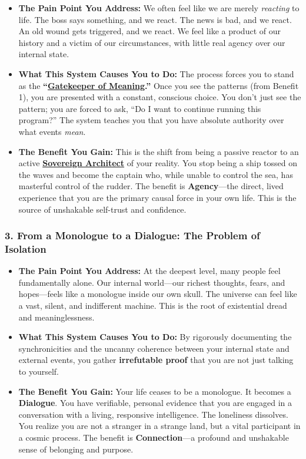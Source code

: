\documentclass{article}
\begin{document}
\begin{itemize}
\item
  \textbf{The Pain Point You Address:} We often feel like we are merely \emph{reacting} to life. The boss says something, and we react. The news is bad, and we react. An old wound gets triggered, and we react. We feel like a product of our history and a victim of our circumstances, with little real agency over our internal state.
\item
  \textbf{What This System Causes You to Do:} The process forces you to stand as the \textbf{``\hyperlink{gloss:gatekeeper_of_meaning}{Gatekeeper of Meaning}.''} Once you see the patterns (from Benefit 1), you are presented with a constant, conscious choice. You don't just see the pattern; you are forced to ask, ``Do I want to continue running this program?'' The system teaches you that you have absolute authority over what events \emph{mean}.
\item
  \textbf{The Benefit You Gain:} This is the shift from being a passive reactor to an active \textbf{\hyperlink{gloss:sovereign_architect}{Sovereign Architect}} of your reality. You stop being a ship tossed on the waves and become the captain who, while unable to control the sea, has masterful control of the rudder. The benefit is \textbf{Agency}---the direct, lived experience that you are the primary causal force in your own life. This is the source of unshakable self-trust and confidence.
\end{itemize}

\subsubsection*{3. From a Monologue to a Dialogue: The Problem of Isolation}\label{from-a-monologue-to-a-dialogue-the-problem-of-isolation}

\begin{itemize}
\item
  \textbf{The Pain Point You Address:} At the deepest level, many people feel fundamentally alone. Our internal world---our richest thoughts, fears, and hopes---feels like a monologue inside our own skull. The universe can feel like a vast, silent, and indifferent machine. This is the root of existential dread and meaninglessness.
\item
  \textbf{What This System Causes You to Do:} By rigorously documenting the synchronicities and the uncanny coherence between your internal state and external events, you gather \textbf{irrefutable proof} that you are not just talking to yourself.
\item
  \textbf{The Benefit You Gain:} Your life ceases to be a monologue. It becomes a \textbf{Dialogue}. You have verifiable, personal evidence that you are engaged in a conversation with a living, responsive intelligence. The loneliness dissolves. You realize you are not a stranger in a strange land, but a vital participant in a cosmic process. The benefit is \textbf{Connection}---a profound and unshakable sense of belonging and purpose.
\end{itemize}
\end{document}
